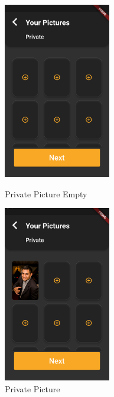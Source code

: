 \documentclass{article}
\begin{document}
\begin{figure}[!htb]
	\centering
	\begin{minipage}{.45\textwidth}
		\centering
		\includegraphics[height=7.7cm,keepaspectratio]{assets/images/ui/signup/20-private-pictures.png}
		\caption{Private Picture Empty}
	\end{minipage}\quad
	\begin{minipage}{.45\textwidth}
		\centering
		\includegraphics[height=7.7cm,keepaspectratio]{assets/images/ui/signup/22-private-pictures-selected.png}
		\caption{Private Picture}
	\end{minipage}
\end{figure}


\clearpage
\end{document}
